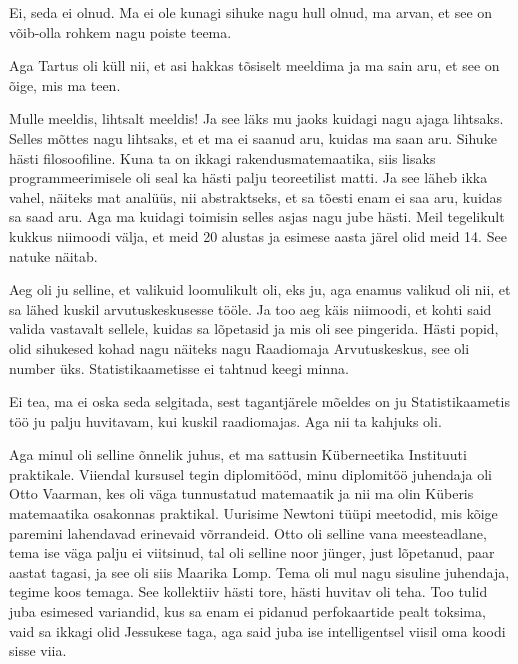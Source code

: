 
Ei, seda ei olnud. Ma ei ole kunagi sihuke nagu hull olnud, ma arvan, et see on võib-olla rohkem nagu poiste teema. 


Aga Tartus oli küll nii, et asi hakkas tõsiselt meeldima ja ma sain aru, et see on õige, mis ma teen. 


Mulle meeldis, lihtsalt meeldis! Ja see läks mu jaoks kuidagi nagu ajaga lihtsaks. Selles mõttes nagu lihtsaks, et et ma ei saanud aru, kuidas ma saan aru. Sihuke hästi filosoofiline. Kuna ta on ikkagi rakendusmatemaatika, siis lisaks  programmeerimisele oli seal ka hästi palju teoreetilist matti. Ja see läheb ikka vahel, näiteks mat analüüs, nii  abstraktseks, et sa tõesti enam ei saa aru, kuidas sa saad aru. Aga ma kuidagi toimisin selles asjas nagu jube hästi. Meil tegelikult kukkus niimoodi välja, et  meid  20 alustas ja esimese aasta järel olid meid 14. See natuke näitab. 


Aeg oli ju selline, et valikuid loomulikult oli, eks ju, aga enamus valikud oli nii, et sa lähed kuskil arvutuskeskusesse tööle. Ja too aeg käis  niimoodi, et kohti said valida vastavalt sellele, kuidas sa lõpetasid ja mis oli see pingerida. Hästi popid, olid sihukesed kohad nagu näiteks nagu Raadiomaja Arvutuskeskus, see oli number üks. Statistikaametisse ei tahtnud keegi minna.


Ei tea, ma ei oska seda selgitada, sest tagantjärele mõeldes on ju Statistikaametis töö ju palju huvitavam, kui kuskil raadiomajas. Aga nii ta kahjuks oli.

Aga minul oli selline õnnelik juhus, et ma sattusin Küberneetika Instituuti  praktikale. Viiendal kursusel tegin diplomitööd, minu diplomitöö juhendaja oli Otto Vaarman, kes oli väga tunnustatud matemaatik ja nii ma olin Küberis matemaatika osakonnas praktikal. Uurisime  Newtoni tüüpi meetodid, mis kõige paremini lahendavad erinevaid võrrandeid. Otto oli selline vana meesteadlane, tema ise väga palju ei viitsinud, tal oli selline noor jünger, just lõpetanud, paar aastat tagasi, ja see oli siis Maarika Lomp. Tema oli mul nagu sisuline juhendaja, tegime koos temaga. See kollektiiv hästi tore, hästi huvitav oli teha. Too tulid juba esimesed variandid, kus sa enam ei pidanud perfokaartide pealt toksima, vaid sa ikkagi olid Jessukese taga, aga said juba ise intelligentsel viisil oma koodi  sisse viia. 

